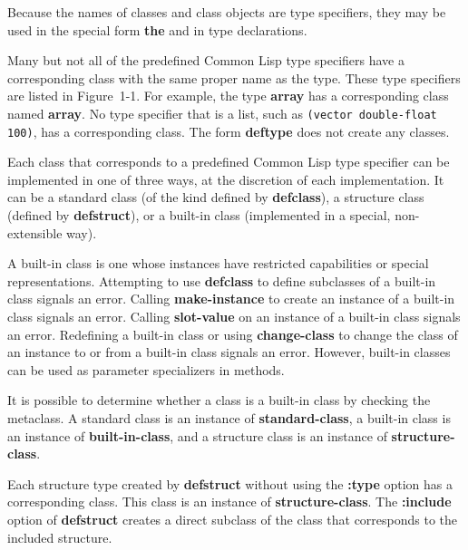 Because the names of classes and class objects are type specifiers, they may
be used in the special form {\bf the} and in type declarations.

Many but not all of the predefined Common Lisp type specifiers have a
corresponding class with the same proper name as the type.  These type
specifiers are listed in Figure~1-1.  For example, the type {\bf array}
has a corresponding class named {\bf array}.  No type specifier that is a
list, such as {\tt (vector double-float 100)}, has a corresponding class.
The form {\bf deftype} does not create any classes.

Each class that corresponds to a predefined Common Lisp type specifier
can be implemented in one of three ways, at the discretion of each
implementation.  It can be a {\bit standard class\/} (of the kind
defined by {\bf defclass}), a {\bit structure class\/} (defined
by {\bf defstruct}), or a {\bit built-in class\/} (implemented in
a special, non-extensible way).

A built-in class is one whose instances have restricted capabilities or
special representations.  Attempting to use {\bf defclass} to define 
subclasses of a built-in class signals an error.  Calling {\bf
make-instance} to create an instance of a built-in class signals an error.
Calling {\bf slot-value} on an instance of a built-in class signals an
error.  Redefining a built-in class or using {\bf change-class} to change
the class of an instance to or from a built-in class signals an error.
However, built-in classes can be used as parameter specializers in
methods.


It is possible to determine whether a class is a built-in class by
checking the metaclass.  A standard class is an instance of {\bf
standard-class}, a built-in class is an instance of {\bf
built-in-class}, and a structure class is an instance of {\bf
structure-class}.

Each structure type created by {\bf defstruct} without using the {\bf
:type} option has a corresponding class.  This class is an instance of
{\bf structure-class}.  
The {\bf :include} option of {\bf defstruct} creates a direct
subclass of the class that corresponds to the included structure.

